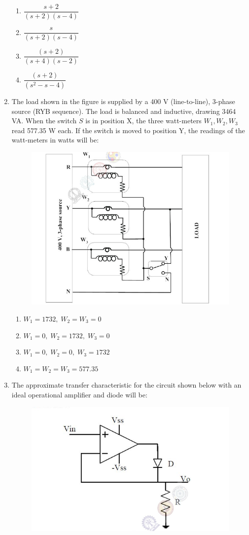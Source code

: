 \documentclass[journal,12pt,onecolumn]{IEEEtran}
\theoremstyle{remark}
\begin{document}
\begin{enumerate}
\begin{multicols}{2}
\begin{enumerate}
\item $\dfrac{s+2}{(s+2)(s-4)}$
\item $\dfrac{s}{(s+2)(s-4)}$
\item $\dfrac{(s+2)}{(s+4)(s-2)}$
\item $\dfrac{(s+2)}{(s^2-s-4)}$
\end{enumerate}
\end{multicols}

\item The load shown in the figure is supplied by a 400 V (line-to-line), 3-phase source (RYB sequence). The load is balanced and inductive, drawing 3464 VA. When the switch $S$ is in position X, the three watt-meters $W_1, W_2, W_3$ read 577.35 W each. If the switch is moved to position Y, the readings of the watt-meters in watts will be:  
\begin{figure}[H]
    \centering
    \includegraphics[width=0.5\columnwidth]{figs/34.png}
    \caption{}
    \label{fig:placeholder}
\end{figure}
\begin{multicols}{2}
\begin{enumerate}
\item $W_1 = 1732, \; W_2 = W_3 = 0$
\item $W_1 = 0, \; W_2 = 1732, \; W_3 = 0$
\item $W_1 = 0, \; W_2 = 0, \; W_3 = 1732$
\item $W_1 = W_2 = W_3 = 577.35$
\end{enumerate}
\end{multicols}




\item The approximate transfer characteristic for the circuit shown below with an ideal operational amplifier and diode will be:  

\begin{figure}[H]
    \centering
    \includegraphics[width=0.5\columnwidth]{figs/35.png}
    \caption{}
    \label{fig:placeholder}
\end{figure}



\end{enumerate}
\end{document}
